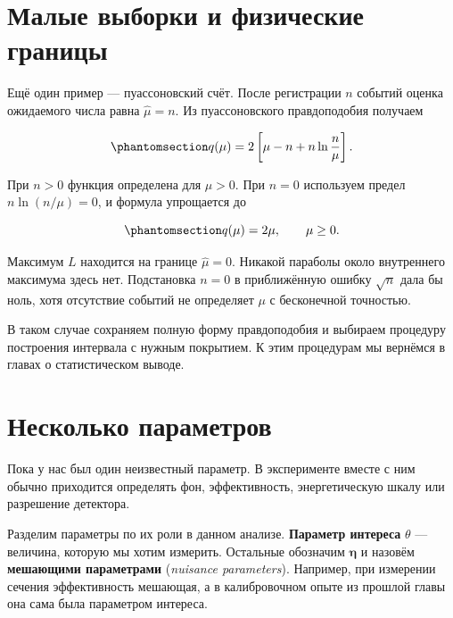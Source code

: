 \documentclass[
  russian,
  11pt,
  a4paper,
  open=any]{scrbook}
\begin{document}
\section{Малые выборки и физические
границы}\label{ux43cux430ux43bux44bux435-ux432ux44bux431ux43eux440ux43aux438-ux438-ux444ux438ux437ux438ux447ux435ux441ux43aux438ux435-ux433ux440ux430ux43dux438ux446ux44b}

Ещё один пример --- пуассоновский счёт. После регистрации \(n\) событий
оценка ожидаемого числа равна \(\widehat\mu=n\). Из пуассоновского
правдоподобия получаем

\begin{equation}\protect\phantomsection\label{eq-ch10-poisson-ratio}{
q(\mu)=2\left[\mu-n+n\ln\frac n\mu\right].
}\end{equation}

При \(n>0\) функция определена для \(\mu>0\). При \(n=0\) используем
предел \(n\ln(n/\mu)=0\), и формула упрощается до

\begin{equation}\protect\phantomsection\label{eq-ch10-zero-count-ratio}{
q(\mu)=2\mu,\qquad\mu\geq0.
}\end{equation}

Максимум \(L\) находится на границе \(\widehat\mu=0\). Никакой параболы
около внутреннего максимума здесь нет. Подстановка \(n=0\) в
приближённую ошибку \(\sqrt n\) дала бы ноль, хотя отсутствие событий не
определяет \(\mu\) с бесконечной точностью.

В таком случае сохраняем полную форму правдоподобия и выбираем процедуру
построения интервала с нужным покрытием. К этим процедурам мы вернёмся в
главах о статистическом выводе.

\section{Несколько
параметров}\label{ux43dux435ux441ux43aux43eux43bux44cux43aux43e-ux43fux430ux440ux430ux43cux435ux442ux440ux43eux432}

Пока у нас был один неизвестный параметр. В эксперименте вместе с ним
обычно приходится определять фон, эффективность, энергетическую шкалу
или разрешение детектора.

Разделим параметры по их роли в данном анализе. \textbf{Параметр
интереса} \(\theta\) --- величина, которую мы хотим измерить. Остальные
обозначим \(\boldsymbol\eta\) и назовём \textbf{мешающими параметрами}
(\emph{nuisance parameters}). Например, при измерении сечения
эффективность мешающая, а в калибровочном опыте из прошлой главы она
сама была параметром интереса.
\end{document}
